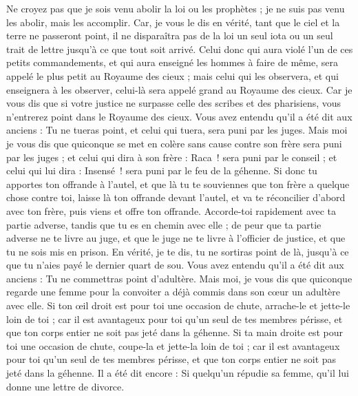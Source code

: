 \begin{multicols}{2}
Ne croyez pas que je sois venu abolir la loi ou les prophètes ; je ne suis pas venu les abolir, mais les accomplir.
Car, je vous le dis en vérité, tant que le ciel et la terre ne passeront point, il ne disparaîtra pas de la loi un seul iota ou un seul trait de lettre jusqu’à ce que tout soit arrivé.
Celui donc qui aura violé l'un de ces petits commandements, et qui aura enseigné les hommes à faire de même, sera appelé le plus petit au Royaume des cieux ; mais celui qui les observera, et qui enseignera à les observer, celui-là sera appelé grand au Royaume des cieux.
Car je vous dis que si votre justice ne surpasse celle des scribes et des pharisiens, vous n'entrerez point dans le Royaume des cieux.
Vous avez entendu qu'il a été dit aux anciens : Tu ne tueras point, et celui qui tuera, sera puni par les juges.
Mais moi je vous dis que quiconque se met en colère sans cause contre son frère sera puni par les juges ; et celui qui dira à son frère : Raca ! sera puni par le conseil ; et celui qui lui dira : Insensé ! sera puni par le feu de la géhenne{}.
Si donc tu apportes ton offrande à l'autel, et que là tu te souviennes que ton frère a quelque chose contre toi,
laisse là ton offrande devant l'autel, et va te réconcilier d’abord avec ton frère, puis viens et offre ton offrande.
Accorde-toi rapidement avec ta partie adverse, tandis que tu es en chemin avec elle ; de peur que ta partie adverse ne te livre au juge, et que le juge ne te livre à l’officier de justice, et que tu ne sois mis en prison.
En vérité, je te dis, tu ne sortiras point de là, jusqu'à ce que tu n’aies payé le dernier quart de sou.
Vous avez entendu qu'il a été dit aux anciens : Tu ne commettras point d’adultère.
Mais moi, je vous dis que quiconque regarde une femme pour la convoiter a déjà commis dans son cœur un adultère avec elle.
Si ton œil droit est pour toi une occasion de chute, arrache-le et jette-le loin de toi ; car il est avantageux pour toi qu'un seul de tes membres périsse, et que ton corps entier ne soit pas jeté dans la géhenne.
Si ta main droite est pour toi une occasion de chute, coupe-la et jette-la loin de toi ; car il est avantageux pour toi qu’un seul de tes membres périsse, et que ton corps entier ne soit pas jeté dans la géhenne.
Il a été dit encore : Si quelqu'un répudie sa femme, qu'il lui donne une lettre de divorce.

\end{multicols}
